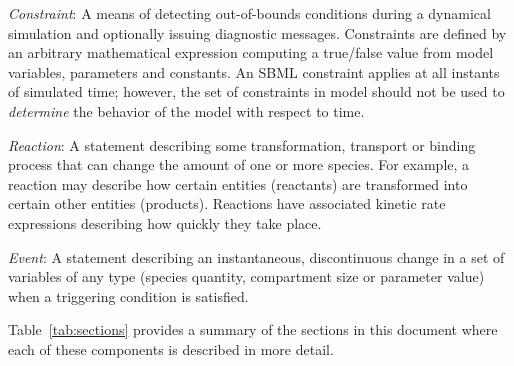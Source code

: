 \begin{description}
\begin{blockChanged}

\item \emph{Constraint}: A means of detecting out-of-bounds
  conditions during a dynamical simulation and optionally issuing
  diagnostic messages.  Constraints are defined by an arbitrary
  mathematical expression computing a true/false value from model
  variables, parameters and constants.  An SBML constraint applies
  at all instants of simulated time; however, the set of
  constraints in model should not be used to \emph{determine} the
  behavior of the model with respect to time.

\end{blockChanged}
  
\item \emph{Reaction}: A statement describing some transformation,
  transport or binding process that can change the amount of one
  or more species.  For example, a reaction may describe how
  certain entities (reactants) are transformed into certain other
  entities (products).  Reactions have associated kinetic rate
  expressions describing how quickly they take place.
  
\item \emph{Event}: A statement describing an instantaneous,
  discontinuous change in a set of variables of any type (species
  quantity, compartment size or parameter value) when a
  triggering condition is satisfied.

\end{description}

Table~\ref{tab:sections} provides a summary of the sections in this
document where each of these components is described in more detail.

